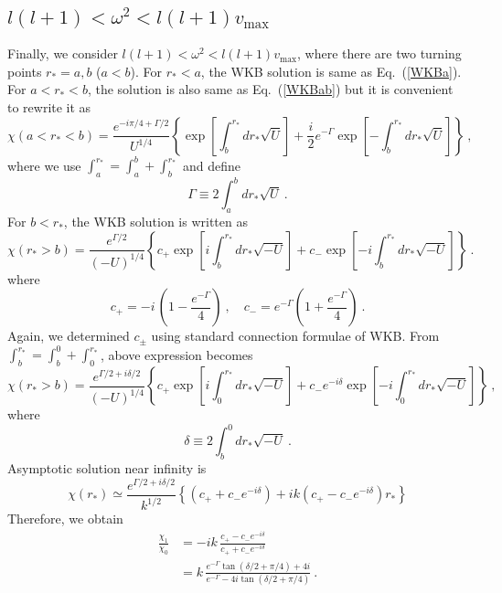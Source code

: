 \documentclass[a4paper,11pt]{article}
\begin{document}
\subsection{\texorpdfstring{$l(l+1) < \omega^2 < l(l+1) v_\textrm{max}$}{Lg}}

    Finally, we consider $l(l+1) < \omega^2 < l(l+1) v_\textrm{max}$, where there are two turning points $r_\ast=a,b$ ($a<b$).
    For $r_\ast<a$, the WKB solution is same as Eq.~(\ref{WKBa}).
    For $a<r_\ast <b$, the solution is also same as Eq.~(\ref{WKBab}) but it is convenient to rewrite it as
    \begin{equation}
     \chi(a<r_\ast < b) = \frac{e^{-i\pi/4+\Gamma/2}}{U^{1/4}}\left\{\exp\left[\int_b^{r_\ast} dr_\ast  \sqrt{U}\right]
    +\frac{i}{2}e^{-\Gamma}\exp\left[-\int_b^{r_\ast} dr_\ast  \sqrt{U}\right]\right\}\ ,
    \end{equation}
    where  we use $\int_a^{r_\ast}=\int_a^b+\int_b^{r_\ast}$ and define
    \begin{equation}
     \Gamma \equiv 2\int_a^b dr_\ast  \sqrt{U}\ .
    \end{equation}
    For $b<r_\ast$, the WKB solution is written as
    \begin{equation}
     \chi(r_\ast >b) = \frac{e^{\Gamma/2}}{(-U)^{1/4}}\left\{c_+\exp\left[i\int_b^{r_\ast} dr_\ast  \sqrt{-U}\right]
    +c_- \exp\left[-i\int_b^{r_\ast} dr_\ast  \sqrt{-U}\right]
    \right\}\ .
    \end{equation}
    where 
    \begin{equation}
    c_+=-i\, \left(1-\frac{e^{-\Gamma}}{4}\right)\ ,\quad 
    c_-=  e^{-\Gamma}\left(1+\frac{e^{-\Gamma}}{4}\right)\ .
    \end{equation}
    Again, we determined $c_\pm$ using standard connection formulae of WKB.
    From $\int_b^{r_\ast}=\int_b^0+\int_0^{r_\ast}$, above expression becomes
    \begin{equation}
    \chi(r_\ast >b) = \frac{e^{\Gamma/2+i\delta/2}}{(-U)^{1/4}}\left\{c_+ \exp\left[i\int_0^{r_\ast} dr_\ast  \sqrt{-U}\right]
    +c_-e^{-i\delta} \exp\left[-i\int_0^{r_\ast} dr_\ast  \sqrt{-U}\right]
    \right\}\ ,
    \end{equation}
    where
    \begin{equation}
    \delta \equiv 2\int_b^0 dr_\ast  \sqrt{-U}\ .
    \end{equation}
    Asymptotic solution near infinity is
    \begin{equation}
    \chi(r_\ast) \simeq \frac{e^{\Gamma/2+i\delta/2}}{k^{1/2}}\left\{(c_++c_-e^{-i\delta})
    +ik(c_+-c_-e^{-i\delta})r_\ast
    \right\}
    \end{equation}
    Therefore, we obtain
    \begin{equation}
    \begin{split}
     \frac{\chi_1}{\chi_0}&=-ik\,\frac{c_+-c_- e^{-i\delta}}{c_++c_-e^{-i\delta}}\\
    &=k\, \frac{e^{-\Gamma} \tan(\delta/2+\pi/4) +4i}{e^{-\Gamma}- 4i \tan(\delta/2+\pi/4)}\ .
    \end{split}
    \end{equation}
\end{document}
